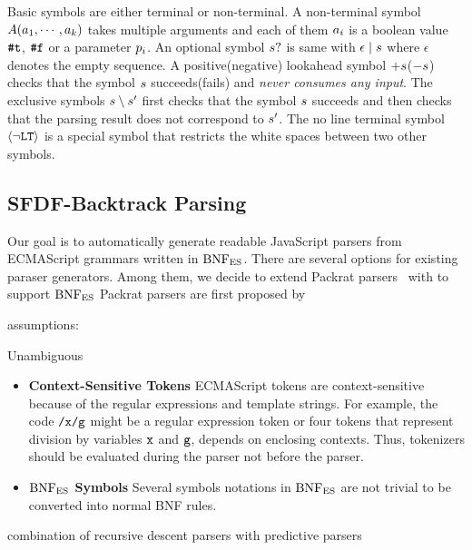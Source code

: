 Basic symbols are either terminal or non-terminal.
A non-terminal symbol \( A(a_1, \cdots, a_k) \)
takes multiple arguments and each of them \( a_i \) is
a boolean value \( \texttt{\#t} \), \( \texttt{\#f} \) or a parameter \( p_i \).
An optional symbol \( s? \) is same with \( \epsilon \mid s \)
where \( \epsilon \) denotes the empty sequence.
A positive(negative) lookahead symbol \( +s \)(\( -s \))
checks that the symbol \( s \) succeeds(fails) and
\textit{never consumes any input}.
The exclusive symbols \( s \setminus s' \)
first checks that the symbol \( s \) succeeds
and then checks that the parsing result does not correspond to \( s' \).
The no line terminal symbol \( \left<\neg\texttt{LT}\right> \) is a special symbol
that restricts the white spaces between two other symbols.

\subsection{SFDF-Backtrack Parsing}

Our goal is to automatically generate readable JavaScript parsers from ECMAScript
grammars written in \( \text{BNF}_{\text{ES}} \). There are several options for existing paraser generators.
Among them, we decide to extend Packrat parsers~\cite{packrat} 
with 
to support \( \text{BNF}_{\text{ES}} \) Packrat parsers are first proposed by 


assumptions:

Unambiguous

\begin{itemize}
  \item \textbf{Context-Sensitive Tokens} ECMAScript tokens are context-sensitive
    because of the regular expressions and template strings.
    For example, the code \( \texttt{/x/g} \) might be a regular expression token
    or four tokens that represent division by variables \( \texttt{x} \) and \( \texttt{g} \),
    depends on enclosing contexts. Thus, tokenizers should be evaluated during the parser
    not before the parser.
  \item \textbf{\( \text{BNF}_{\text{ES}} \) Symbols} Several symbols notations in \( \text{BNF}_{\text{ES}} \) are
    not trivial to be converted into normal BNF rules. 
\end{itemize}


% 
% 
% 
% 
% 
% 
% 
combination of recursive descent parsers with predictive parsers

